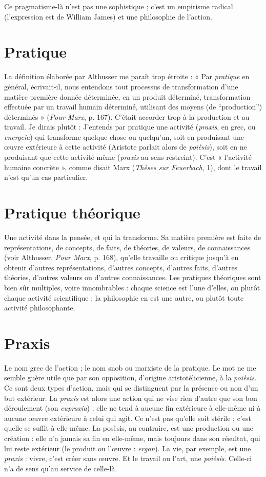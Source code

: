 Ce pragmatisme-là n’est pas une sophistique ; c’est un empirisme radical
(l'expression est de William James) et une philosophie de l’action.

\section{Pratique}
La définition élaborée par Althusser me paraît trop étroite :
« Par {\it pratique} en général, écrivait-il, nous entendons tout processus
de transformation d’une matière première donnée déterminée, en un
produit déterminé, transformation effectuée par un travail humain déterminé,
utilisant des moyens (de “production”) déterminés » ({\it Pour Marx}, p. 167).
C'était accorder trop à la production et au travail. Je dirais plutôt : J'entends
par pratique une activité ({\it praxis}, en grec, ou {\it energeia}) qui transforme quelque
chose ou quelqu'un, soit en produisant une œuvre extérieure à cette activité
(Aristote parlait alors de {\it poièsis}), soit en ne produisant que cette activité même
({\it praxis} au sens restreint). C’est « l’activité humaine concrète », comme disait
Marx ({\it Thèses sur Feuerbach}, 1), dont le travail n’est qu’un cas particulier.

\section{Pratique théorique}
Une activité dans la pensée, et qui la transforme.
Sa matière première est faite de représentations,
de concepts, de faits, de théories, de valeurs, de connaissances (voir
Althusser, {\it Pour Marx}, p. 168), qu’elle travaille ou critique jusqu’à en obtenir
d’autres représentations, d’autres concepts, d’autres faits, d’autres théories,
d’autres valeurs ou d’autres connaissances. Les pratiques théoriques sont bien
sûr multiples, voire innombrables : chaque science est l’une d’elles, ou plutôt
chaque activité scientifique ; la philosophie en est une autre, ou plutôt toute
activité philosophante.

\section{Praxis}
Le nom grec de l’action ; le nom snob ou marxiste de la pratique.
Le mot ne me semble guère utile que par son opposition, d’origine
aristotélicienne, à la {\it poièsis}. Ce sont deux types d’action, mais qui se distinguent
par la présence ou non d’un but extérieur. La {\it praxis} est alors une action
qui ne vise rien d’autre que son bon déroulement (son {\it eupraxia}) : elle ne tend
à aucune fin extérieure à elle-même ni à aucune œuvre extérieure à celui qui
agit. Ce n’est pas qu’elle soit stérile ; c’est quelle se suffit à elle-même. La posèsis,
au contraire, est une production ou une création : elle n’a jamais sa fin en elle-même,
mais toujours dans son résultat, qui lui reste extérieur (le produit ou
l’œuvre : {\it ergon}). La vie, par exemple, est une {\it praxis} : vivre, c’est créer sans
œuvre. Et le travail ou l’art, une {\it poièsis}. Celle-ci n’a de sens qu’au service de
celle-là.

